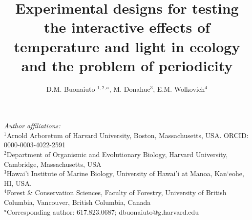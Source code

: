 \documentclass[11pt]{article}
\title{Experimental designs for testing the interactive effects of temperature and light in ecology and the problem of periodicity }
\date{}
\author{D.M. Buonaiuto $^{1,2,a}$, M. Donahue$^{3}$, E.M. Wolkovich$^{4}$}
\begin{document}
\maketitle
\noindent \emph{Author affiliations:}\\
\noindent $^1$Arnold Arboretum of Harvard University, Boston, Massachusetts, USA. ORCID: 0000-0003-4022-2591\\
$^2$Department of Organismic and Evolutionary Biology, Harvard University, Cambridge, Massachusetts, USA \\
$^3$Hawai'i Institute of Marine Biology, University of Hawai'i at Manoa, Kan‘eohe, HI, USA.\\
$^4$Forest \& Conservation Sciences, Faculty of Forestry, University of British Columbia, Vancouver, British Columbia, Canada\\
$^a$Corresponding author: 617.823.0687; dbuonaiuto@g.harvard.edu\\
\pagebreak
\maketitle
\end{document}
